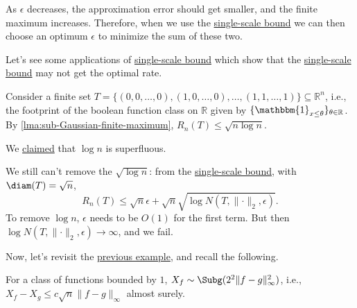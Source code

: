 \begin{remark}
	As \(\epsilon \) decreases, the approximation error should get smaller, and the finite maximum increases. Therefore, when we use the \hyperref[lma:single-scale-bound]{single-scale bound} we can then choose an optimum \(\epsilon \) to minimize the sum of these two.
\end{remark}

Let's see some applications of \hyperref[lma:single-scale-bound]{single-scale bound} which show that the \hyperref[lma:single-scale-bound]{single-scale bound} may not get the optimal rate.

\begin{eg}
	Consider a finite set \(T = \{ (0, 0, \dots , 0), (1, 0, \dots , 0), \dots , (1, 1, \dots , 1) \} \subseteq \mathbb{R} ^n\), i.e., the footprint of the boolean function class on \(\mathbb{R} \) given by \(\{ \mathbbm{1}_{x \leq \theta } \}_{\theta \in \mathbb{R}} \). By \autoref{lma:sub-Gaussian-finite-maximum}, \(R_n(T) \leq \sqrt{n \log n}\).

	\begin{prev}
		We \hyperref[rmk:log-n-superfluous]{claimed} that \(\log n\) is superfluous.
	\end{prev}

	We still can't remove the \(\sqrt{\log n}\): from the \hyperref[lma:single-scale-bound]{single-scale bound}, with \(\diam(T) = \sqrt{n} \),
	\[
		R_n(T) \leq \sqrt{n} \epsilon + \sqrt{n} \sqrt{\log N(T, \lVert \cdot \rVert _2, \epsilon )}.
	\]
	To remove \(\log n\), \(\epsilon\) needs to be \(O(1)\) for the first term. But then \(\log N(T, \lVert \cdot \rVert _2, \epsilon ) \to \infty \), and we fail.
\end{eg}

Now, let's revisit the \hyperref[eg:supremum-of-empirical-process]{previous example}, and recall the following.

\begin{prev}
	For a class of functions bounded by \(1\), \(X_f \sim \Subg(2^2 \lVert f-g \rVert _\infty ^2)\), i.e., \(X_f - X_g \leq c \sqrt{n} \lVert f - g \rVert _\infty \) almost surely.
\end{prev}

